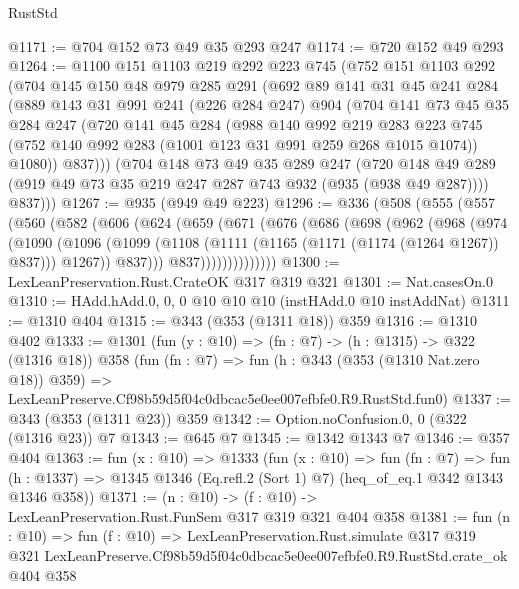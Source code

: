 \begin{lexlean}{RustStd}
\begin{coremodule}
@1171 := @704 @152 @73 @49 @35 @293 @247
@1174 := @720 @152 @49 @293
@1264 := @1100
    @151
    @1103
    @219
    @292
    @223
    @745
    (@752
      @151
      @1103
      @292
      (@704
        @145
        @150
        @48
        @979
        @285
        @291
        (@692
          @89
          @141
          @31
          @45
          @241
          @284
          (@889
            @143
            @31
            @991
            @241
            (@226 @284 @247)
            @904
            (@704
              @141
              @73
              @45
              @35
              @284
              @247
              (@720
                @141
                @45
                @284
                (@988
                  @140
                  @992
                  @219
                  @283
                  @223
                  @745
                  (@752 @140 @992 @283 (@1001 @123 @31 @991 @259 @268 @1015 @1074))
                  @1080))
              @837)))
        (@704
          @148
          @73
          @49
          @35
          @289
          @247
          (@720 @148 @49 @289 (@919 @49 @73 @35 @219 @247 @287 @743 @932 (@935 (@938 @49 @287))))
          @837)))
@1267 := @935 (@949 @49 @223)
@1296 := @336
    (@508
      (@555
        (@557
          (@560
            (@582
              (@606
                (@624
                  (@659
                    (@671
                      (@676
                        (@686
                          (@698
                            (@962
                              (@968
                                (@974
                                  (@1090
                                    (@1096
                                      (@1099
                                        (@1108
                                          (@1111 (@1165 (@1171 (@1174 (@1264 @1267)) @837)))
                                          @1267))
                                      @837)))
                                @837))))))))))))))
@1300 := LexLeanPreservation.Rust.CrateOK @317 @319 @321
@1301 := Nat.casesOn.{0}
@1310 := HAdd.hAdd.{0, 0, 0} @10 @10 @10 (instHAdd.{0} @10 instAddNat)
@1311 := @1310 @404
@1315 := @343 (@353 (@1311 @18)) @359
@1316 := @1310 @402
@1333 := @1301
    (fun (y : @10) => (fn : @7) -> (h : @1315) -> @322 (@1316 @18))
    @358
    (fun (fn : @7) =>
    fun (h : @343 (@353 (@1310 Nat.zero @18)) @359) =>
    LexLeanPreserve.Cf98b59d5f04c0dbcac5e0ee007efbfe0.R9.RustStd.fun0)
@1337 := @343 (@353 (@1311 @23)) @359
@1342 := Option.noConfusion.{0, 0} (@322 (@1316 @23)) @7
@1343 := @645 @7
@1345 := @1342 @1343 @7
@1346 := @357 @404
@1363 := fun (x : @10) =>
  @1333
    (fun (x : @10) =>
    fun (fn : @7) =>
    fun (h : @1337) => @1345 @1346 (Eq.refl.{2} (Sort 1) @7) (heq_of_eq.{1} @342 @1343 @1346 @358))
@1371 := (n : @10) -> (f : @10) -> LexLeanPreservation.Rust.FunSem @317 @319 @321 @404 @358
@1381 := fun (n : @10) =>
  fun (f : @10) =>
  LexLeanPreservation.Rust.simulate
    @317
    @319
    @321
    LexLeanPreserve.Cf98b59d5f04c0dbcac5e0ee007efbfe0.R9.RustStd.crate_ok
    @404
    @358
\end{coremodule}
\end{lexlean}
